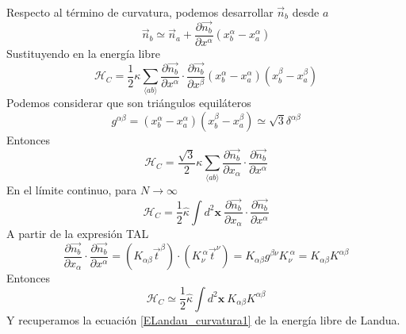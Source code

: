 Respecto al término de curvatura, podemos desarrollar $\vec{n}_{b}$ desde $a$
\begin{equation}
\vec{n}_b\simeq\vec{n}_a+\frac{\partial \vec{n_b}}{\partial x^{\alpha}}(x_b^{\alpha}-x_a^{\alpha})
\end{equation}
Sustituyendo en la energía libre
\begin{equation}
\mathcal{H}_C=\frac{1}{2}\kappa\sum_{\langle ab\rangle}\frac{\partial
  \vec{n_b}}{\partial x^{\alpha}}\cdot\frac{\partial \vec{n_b}}{\partial x^{\beta}} (x_b^{\alpha}-x_a^{\alpha})(x_b^{\beta}-x_a^{\beta})
\end{equation}
Podemos considerar que son triángulos equiláteros
\begin{equation}
g^{\alpha\beta}=(x_b^{\alpha}-x_a^{\alpha})(x_b^{\beta}-x_a^{\beta})\simeq
\sqrt{3} \delta^{\alpha\beta}
\end{equation}
Entonces
\begin{equation}
\mathcal{H}_C=\frac{\sqrt{3}}{2}\kappa\sum_{\langle ab\rangle}\frac{\partial
  \vec{n_b}}{\partial x_{\alpha}}\cdot\frac{\partial \vec{n_b}}{\partial x^{\alpha}}
\end{equation}
En el límite continuo, para $N\rightarrow \infty$
\begin{equation}
\mathcal{H}_C=\frac{1}{2}\hat{\kappa}\int d^2\mathbf{x}\ \frac{\partial
  \vec{n_b}}{\partial x_{\alpha}}\cdot\frac{\partial \vec{n_b}}{\partial x^{\alpha}}
\end{equation}
A partir de la expresión TAL
\begin{equation}
\frac{\partial \vec{n_b}}{\partial x_{\alpha}}\cdot\frac{\partial
  \vec{n_b}}{\partial x^{\alpha}}=(K_{\alpha\beta}\vec{t}^{\beta})\cdot(K_{\nu}^{\
  \alpha}\vec{t}^{\nu})=K_{\alpha\beta}g^{\beta\nu}K_{\nu}^{\ \alpha}=K_{\alpha\beta}K^{\alpha\beta}
\end{equation}
Entonces 
\begin{equation}
\mathcal{H}_C\simeq\frac{1}{2}\hat{\kappa}\int d^2\mathbf{x}\ K_{\alpha\beta}K^{\alpha\beta}
\end{equation}
Y recuperamos la ecuación \eqref{ELandau_curvatura1} de la energía libre de Landua.

